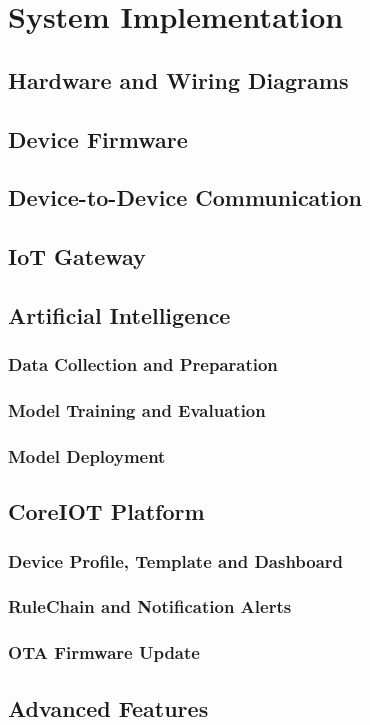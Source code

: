\documentclass[12pt,a4paper]{report}
\begin{document}
\chapter{System Implementation}
\section{Hardware and Wiring Diagrams}
\section{Device Firmware}
\section{Device-to-Device Communication}
\section{IoT Gateway}
\section{Artificial Intelligence}
\subsection{Data Collection and Preparation}
\subsection{Model Training and Evaluation}
\subsection{Model Deployment}
\section{CoreIOT Platform}
\subsection{Device Profile, Template and Dashboard}
\subsection{RuleChain and Notification Alerts}
\subsection{OTA Firmware Update}
\section{Advanced Features}
\end{document}
